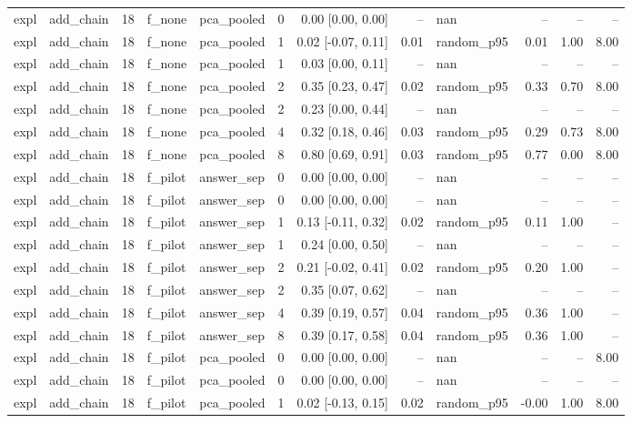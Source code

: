 \begin{tabular}{llrllrrrlrrr}
expl & add\_chain & 18 & f\_none & pca\_pooled & 0 & 0.00 [0.00, 0.00] & -- & nan & -- & -- & -- \\
expl & add\_chain & 18 & f\_none & pca\_pooled & 1 & 0.02 [-0.07, 0.11] & 0.01 & random\_p95 & 0.01 & 1.00 & 8.00 \\
expl & add\_chain & 18 & f\_none & pca\_pooled & 1 & 0.03 [0.00, 0.11] & -- & nan & -- & -- & -- \\
expl & add\_chain & 18 & f\_none & pca\_pooled & 2 & 0.35 [0.23, 0.47] & 0.02 & random\_p95 & 0.33 & 0.70 & 8.00 \\
expl & add\_chain & 18 & f\_none & pca\_pooled & 2 & 0.23 [0.00, 0.44] & -- & nan & -- & -- & -- \\
expl & add\_chain & 18 & f\_none & pca\_pooled & 4 & 0.32 [0.18, 0.46] & 0.03 & random\_p95 & 0.29 & 0.73 & 8.00 \\
expl & add\_chain & 18 & f\_none & pca\_pooled & 8 & 0.80 [0.69, 0.91] & 0.03 & random\_p95 & 0.77 & 0.00 & 8.00 \\
expl & add\_chain & 18 & f\_pilot & answer\_sep & 0 & 0.00 [0.00, 0.00] & -- & nan & -- & -- & -- \\
expl & add\_chain & 18 & f\_pilot & answer\_sep & 0 & 0.00 [0.00, 0.00] & -- & nan & -- & -- & -- \\
expl & add\_chain & 18 & f\_pilot & answer\_sep & 1 & 0.13 [-0.11, 0.32] & 0.02 & random\_p95 & 0.11 & 1.00 & -- \\
expl & add\_chain & 18 & f\_pilot & answer\_sep & 1 & 0.24 [0.00, 0.50] & -- & nan & -- & -- & -- \\
expl & add\_chain & 18 & f\_pilot & answer\_sep & 2 & 0.21 [-0.02, 0.41] & 0.02 & random\_p95 & 0.20 & 1.00 & -- \\
expl & add\_chain & 18 & f\_pilot & answer\_sep & 2 & 0.35 [0.07, 0.62] & -- & nan & -- & -- & -- \\
expl & add\_chain & 18 & f\_pilot & answer\_sep & 4 & 0.39 [0.19, 0.57] & 0.04 & random\_p95 & 0.36 & 1.00 & -- \\
expl & add\_chain & 18 & f\_pilot & answer\_sep & 8 & 0.39 [0.17, 0.58] & 0.04 & random\_p95 & 0.36 & 1.00 & -- \\
expl & add\_chain & 18 & f\_pilot & pca\_pooled & 0 & 0.00 [0.00, 0.00] & -- & nan & -- & -- & 8.00 \\
expl & add\_chain & 18 & f\_pilot & pca\_pooled & 0 & 0.00 [0.00, 0.00] & -- & nan & -- & -- & -- \\
expl & add\_chain & 18 & f\_pilot & pca\_pooled & 1 & 0.02 [-0.13, 0.15] & 0.02 & random\_p95 & -0.00 & 1.00 & 8.00 \\

\end{tabular}
